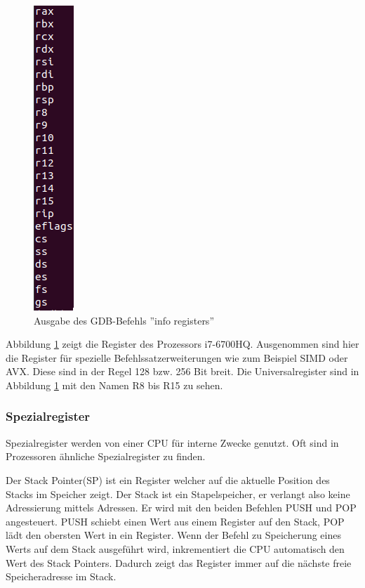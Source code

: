 \documentclass[12pt]{article}
\begin{document}


\begin{figure}
\centering
\includegraphics[scale=0.5]{inforeg}
\centering
\caption{Ausgabe des GDB-Befehls ''info registers''}
\label{fig:inforeg}
\end{figure}

\noindent Abbildung \ref{fig:inforeg} zeigt die Register des Prozessors i7-6700HQ. Ausgenommen sind hier die Register für spezielle Befehlssatzerweiterungen wie zum Beispiel SIMD oder AVX. Diese sind in der Regel 128 bzw. 256 Bit breit. Die Universalregister sind in Abbildung \ref{fig:inforeg} mit den Namen R8 bis R15 zu sehen.
\subsubsection{Spezialregister}
Spezialregister werden von einer CPU für interne Zwecke genutzt. Oft sind in Prozessoren ähnliche Spezialregister zu finden. 

\par \bigskip
\noindent Der Stack Pointer(SP) ist ein Register welcher auf die aktuelle Position des Stacks im Speicher zeigt. Der Stack ist ein Stapelspeicher, er verlangt also keine Adressierung mittels Adressen. Er wird mit den beiden Befehlen PUSH und POP angesteuert. PUSH schiebt einen Wert aus einem Register auf den Stack, POP lädt den obersten Wert in ein Register.  Wenn der Befehl zu Speicherung eines Werts auf dem Stack ausgeführt wird, inkrementiert die CPU automatisch den Wert des Stack Pointers. Dadurch zeigt das Register immer auf die nächste freie Speicheradresse im Stack.
\end{document}

